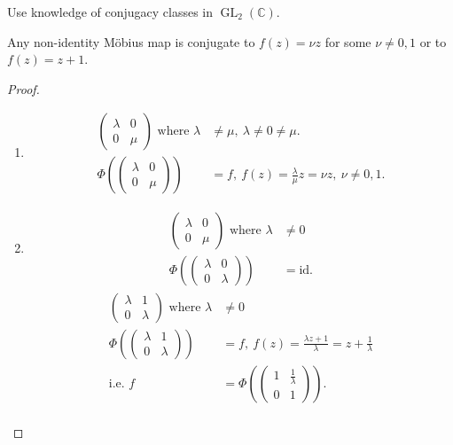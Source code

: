 Use knowledge of conjugacy classes in $\operatorname{GL}_2(\mathbb{C})$.

\begin{theorem} \label{thm:17}
    Any non-identity M\"obius map is conjugate to $f(z) = \nu z$ for some $\nu \neq 0, 1$ or to $f(z) = z + 1$.
\end{theorem} 

\begin{proof} ~
    \begin{enumerate}
        \item
        \begin{align*}
            \begin{pmatrix}\lambda & 0 \\0 & \mu\end{pmatrix} \text{ where } \lambda &\neq \mu,\ \lambda \neq 0 \neq \mu. \\
            \Phi \left( \begin{pmatrix}\lambda & 0 \\0 & \mu\end{pmatrix} \right) &= f,\ f(z) = \frac{\lambda}{\mu} z = \nu z,\ \nu \neq 0, 1.
        \end{align*}
        \item
        \begin{align*}
            \begin{pmatrix}\lambda & 0 \\0 & \mu\end{pmatrix} \text{ where } \lambda &\neq 0 \\
            \Phi \left( \begin{pmatrix}\lambda & 0 \\0 & \lambda \end{pmatrix} \right) &= \text{id}.
        \end{align*}
        \mathitem \begin{align*}
            \begin{pmatrix}\lambda & 1 \\0 & \lambda\end{pmatrix} \text{ where } \lambda &\neq 0 \\
            \Phi \left( \begin{pmatrix}\lambda & 1 \\0 & \lambda \end{pmatrix} \right) &= f,\ f(z) = \frac{\lambda z + 1}{\lambda} = z + \frac{1}{\lambda} \\
            \text{i.e. } f &= \Phi \left( \begin{pmatrix}1 & \frac{1}{\lambda} \\0 & 1\end{pmatrix} \right). \\

\end{align*}
\end{enumerate}
\end{proof}
